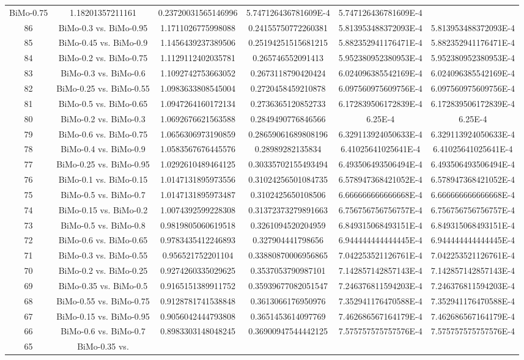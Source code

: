 \documentclass[a4paper,10pt]{article}
\begin{document}
\begin{landscape}
\begin{table}[!htp]
\begin{tabular}{cccccc}
BiMo-0.75&1.18201357211161&0.23720031565146996&5.747126436781609E-4&5.747126436781609E-4\\86&BiMo-0.3 vs. BiMo-0.95&1.1711026775998088&0.24155750772260381&5.813953488372093E-4&5.813953488372093E-4\\85&BiMo-0.45 vs. BiMo-0.9&1.1456439237389506&0.25194251515681215&5.882352941176471E-4&5.882352941176471E-4\\84&BiMo-0.2 vs. BiMo-0.75&1.1129112402035781&0.265746552091413&5.952380952380953E-4&5.952380952380953E-4\\83&BiMo-0.3 vs. BiMo-0.6&1.1092742753663052&0.2673118790420424&6.024096385542169E-4&6.024096385542169E-4\\82&BiMo-0.25 vs. BiMo-0.55&1.0983633808545004&0.2720458459210878&6.097560975609756E-4&6.097560975609756E-4\\81&BiMo-0.5 vs. BiMo-0.65&1.0947264160172134&0.2736365120852733&6.172839506172839E-4&6.172839506172839E-4\\80&BiMo-0.2 vs. BiMo-0.3&1.0692676621563588&0.2849490776846566&6.25E-4&6.25E-4\\79&BiMo-0.6 vs. BiMo-0.75&1.0656306973190859&0.28659061689808196&6.329113924050633E-4&6.329113924050633E-4\\78&BiMo-0.4 vs. BiMo-0.9&1.0583567676445576&0.28989282135834&6.41025641025641E-4&6.41025641025641E-4\\77&BiMo-0.25 vs. BiMo-0.95&1.0292610489464125&0.30335702155493494&6.493506493506494E-4&6.493506493506494E-4\\76&BiMo-0.1 vs. BiMo-0.15&1.0147131895973556&0.31024256501084735&6.578947368421052E-4&6.578947368421052E-4\\75&BiMo-0.5 vs. BiMo-0.7&1.0147131895973487&0.3102425650108506&6.666666666666668E-4&6.666666666666668E-4\\74&BiMo-0.15 vs. BiMo-0.2&1.0074392599228308&0.31372373279891663&6.756756756756757E-4&6.756756756756757E-4\\73&BiMo-0.5 vs. BiMo-0.8&0.9819805060619518&0.3261094520204959&6.849315068493151E-4&6.849315068493151E-4\\72&BiMo-0.6 vs. BiMo-0.65&0.9783435412246893&0.327904441798656&6.944444444444445E-4&6.944444444444445E-4\\71&BiMo-0.3 vs. BiMo-0.55&0.956521752201104&0.33880870006956865&7.042253521126761E-4&7.042253521126761E-4\\70&BiMo-0.2 vs. BiMo-0.25&0.9274260335029625&0.3537053790987101&7.142857142857143E-4&7.142857142857143E-4\\69&BiMo-0.35 vs. BiMo-0.5&0.9165151389911752&0.35939677082051547&7.246376811594203E-4&7.246376811594203E-4\\68&BiMo-0.55 vs. BiMo-0.75&0.9128781741538848&0.3613066176950976&7.352941176470588E-4&7.352941176470588E-4\\67&BiMo-0.15 vs. BiMo-0.95&0.9056042444793808&0.3651453614097769&7.462686567164179E-4&7.462686567164179E-4\\66&BiMo-0.6 vs. BiMo-0.7&0.8983303148048245&0.36900947544442125&7.575757575757576E-4&7.575757575757576E-4\\65&BiMo-0.35 vs. 
\end{tabular}
\end{table}
\end{landscape}
\end{document}
